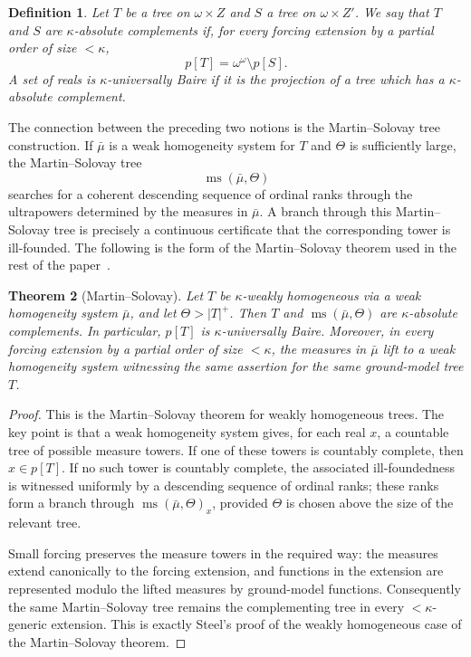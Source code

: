 \documentclass[a4paper,11pt]{article}
\newtheorem{theorem}{Theorem}[section]
\newtheorem{definition}[theorem]{Definition}
\begin{document}
\begin{definition}\label{def:absolute-complements}
Let $T$ be a tree on $\omega\times Z$ and $S$ a tree on $\omega\times Z'$.  We say that $T$ and $S$ are \emph{$\kappa$-absolute complements} if, for every forcing extension by a partial order of size $<\kappa$,
\[
   p[T]=\omega^\omega\setminus p[S].
\]
A set of reals is \emph{$\kappa$-universally Baire} if it is the projection of a tree which has a $\kappa$-absolute complement.
\end{definition}

The connection between the preceding two notions is the Martin--Solovay tree construction.  If $\bar\mu$ is a weak homogeneity system for $T$ and $\Theta$ is sufficiently large, the Martin--Solovay tree
\[
   \operatorname{ms}(\bar\mu,\Theta)
\]
searches for a coherent descending sequence of ordinal ranks through the ultrapowers determined by the measures in $\bar\mu$.  A branch through this Martin--Solovay tree is precisely a continuous certificate that the corresponding tower is ill-founded.  The following is the form of the Martin--Solovay theorem used in the rest of the paper~\cite[Theorem~2.20 and Corollary~2.21]{steel2009derived}.

\begin{theorem}[Martin--Solovay]\label{thm:ms-weak-homogeneous-ub}
Let $T$ be $\kappa$-weakly homogeneous via a weak homogeneity system $\bar\mu$, and let $\Theta>|T|^+$.  Then $T$ and $\operatorname{ms}(\bar\mu,\Theta)$ are $\kappa$-absolute complements.  In particular, $p[T]$ is $\kappa$-universally Baire.  Moreover, in every forcing extension by a partial order of size $<\kappa$, the measures in $\bar\mu$ lift to a weak homogeneity system witnessing the same assertion for the same ground-model tree $T$.
\end{theorem}

\begin{proof}
This is the Martin--Solovay theorem for weakly homogeneous trees.  The key point is that a weak homogeneity system gives, for each real $x$, a countable tree of possible measure towers.  If one of these towers is countably complete, then $x\in p[T]$.  If no such tower is countably complete, the associated ill-foundedness is witnessed uniformly by a descending sequence of ordinal ranks; these ranks form a branch through $\operatorname{ms}(\bar\mu,\Theta)_x$, provided $\Theta$ is chosen above the size of the relevant tree.

Small forcing preserves the measure towers in the required way: the measures extend canonically to the forcing extension, and functions in the extension are represented modulo the lifted measures by ground-model functions.  Consequently the same Martin--Solovay tree remains the complementing tree in every $<\kappa$-generic extension.  This is exactly Steel's proof of the weakly homogeneous case of the Martin--Solovay theorem.
\end{proof}
\end{document}
